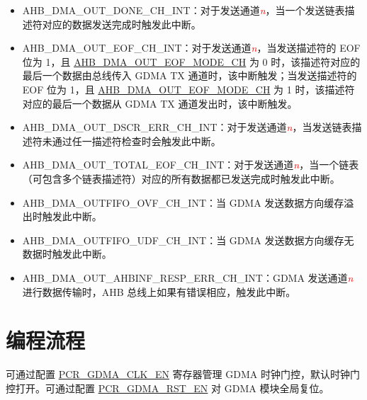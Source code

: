 \documentclass[main\_\_CN.tex]{subfiles}
\begin{document}
\begin{itemize}
    \item \label{int:GDMAOUTDONEINT}AHB\_DMA\_OUT\_DONE\_CH\_INT：对于发送通道\textcolor{red}{\it{n}}，当一个发送链表描述符对应的数据发送完成时触发此中断。
    \item \label{int:GDMAOUTEOFINT}AHB\_DMA\_OUT\_EOF\_CH\_INT：对于发送通道\textcolor{red}{\it{n}}，当发送描述符的 EOF 位为 1，且 \hyperref[fielddesc:AHBDMAOUTEOFMODECHN]{AHB\_DMA\_OUT\_EOF\_MODE\_CH} 为 0 时，该描述符对应的最后一个数据由总线传入 GDMA TX 通道时，该中断触发；当发送描述符的 EOF 位为 1，且 \hyperref[fielddesc:AHBDMAOUTEOFMODECHN]{AHB\_DMA\_OUT\_EOF\_MODE\_CH} 为 1 时，该描述符对应的最后一个数据从 GDMA TX 通道发出时，该中断触发。
    \item \label{int:GDMAOUTDSCRERRINT}AHB\_DMA\_OUT\_DSCR\_ERR\_CH\_INT：对于发送通道\textcolor{red}{\it{n}}，当发送链表描述符未通过任一描述符检查时会触发此中断。
    \item \label{int:GDMAOUTTOTALEOFINT}AHB\_DMA\_OUT\_TOTAL\_EOF\_CH\_INT：对于发送通道\textcolor{red}{\it{n}}，当一个链表（可包含多个链表描述符）对应的所有数据都已发送完成时触发此中断。
    \item \label{int:GDMAOUTFIFOOVFINT} AHB\_DMA\_OUTFIFO\_OVF\_CH\_INT：当 GDMA 发送数据方向缓存溢出时触发此中断。
    \item \label{int:GDMAOUTFIFOUDFINT}AHB\_DMA\_OUTFIFO\_UDF\_CH\_INT：当 GDMA 发送数据方向缓存无数据时触发此中断。
    \item \label{int:GDMAOUTAHBINFRESPERRINT}AHB\_DMA\_OUT\_AHBINF\_RESP\_ERR\_CH\_INT：GDMA 发送通道\textcolor{red}{\it{n}} 进行数据传输时，AHB 总线上如果有错误相应，触发此中断。
\end{itemize}


\section{编程流程}

可通过配置 \hyperref[fielddesc:PCRGDMACLKEN]{PCR\_GDMA\_CLK\_EN} 寄存器管理 GDMA 时钟门控，默认时钟门控打开。可通过配置 \hyperref[fielddesc:PCRGDMARSTEN]{PCR\_GDMA\_RST\_EN} 对 GDMA 模块全局复位。
\end{document}
